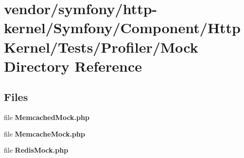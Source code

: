 \section{vendor/symfony/http-\/kernel/\+Symfony/\+Component/\+Http\+Kernel/\+Tests/\+Profiler/\+Mock Directory Reference}
\label{dir_b3423f0a3df9df8773c082dd1cf4ddf8}
\subsection*{Files}
\begin{DoxyCompactItemize}
\item 
file {\bf Memcached\+Mock.\+php}
\item 
file {\bf Memcache\+Mock.\+php}
\item 
file {\bf Redis\+Mock.\+php}
\end{DoxyCompactItemize}
